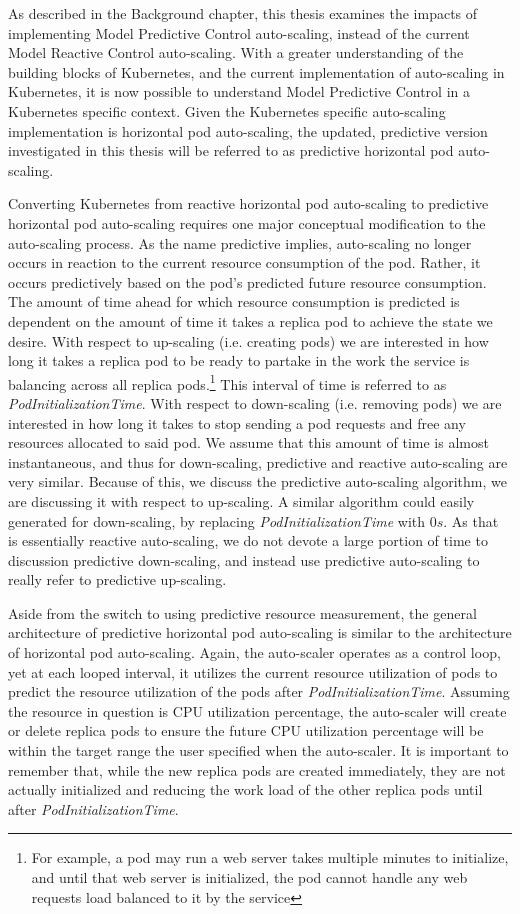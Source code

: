 As described in the Background chapter, this thesis examines the impacts of
implementing Model Predictive Control auto-scaling, instead of the current Model Reactive
Control auto-scaling. With a greater understanding of the building blocks of
Kubernetes, and the current implementation of auto-scaling in Kubernetes, it is
now possible to understand Model Predictive Control in a Kubernetes specific
context. Given the Kubernetes specific auto-scaling implementation is horizontal
pod auto-scaling, the updated, predictive version investigated in this thesis
will be referred to as predictive horizontal pod auto-scaling.

Converting Kubernetes from reactive horizontal pod auto-scaling to predictive
horizontal pod auto-scaling requires one major conceptual modification to the
auto-scaling process. As the name predictive implies, auto-scaling no longer
occurs in reaction to the current resource consumption of the pod. Rather, it occurs
predictively based on the pod's predicted future resource consumption. The
amount of time ahead for which resource consumption is predicted is dependent on
the amount of time it takes a replica pod to achieve the state we desire. With
respect to up-scaling (i.e. creating pods) we are interested in how long it
takes a replica pod to be ready to partake in the work the
service is balancing across all replica pods.\footnote{For example, a pod may
run a web server takes multiple minutes to initialize, and until that web server
is initialized, the pod cannot handle any web requests load balanced to it by
the service} This interval of time is referred to as \textit{PodInitializationTime}.
With respect to down-scaling (i.e. removing pods) we are interested in how long
it takes to stop sending a pod requests and free any resources allocated to said
pod. We assume that this amount of time is almost instantaneous, and thus for
down-scaling, predictive and reactive auto-scaling are very similar. Because of
this, we discuss the predictive auto-scaling algorithm, we are discussing it
with respect to up-scaling. A similar algorithm could easily generated for
down-scaling, by replacing \textit{PodInitializationTime} with $0s$. As that is
essentially reactive auto-scaling, we do not devote a large portion of time to
discussion predictive down-scaling, and instead use predictive auto-scaling to
really refer to predictive up-scaling.

Aside from the switch to using predictive resource measurement, the
general architecture of predictive horizontal pod auto-scaling is similar to the
architecture of horizontal pod auto-scaling. Again, the auto-scaler operates as a
control loop, yet at each looped interval, it utilizes the current resource
utilization of pods to predict the resource utilization of the pods after
\textit{PodInitializationTime}. Assuming the resource in question is CPU
utilization percentage, the auto-scaler will create or delete replica pods
to ensure the future CPU utilization percentage will be within the target range
the user specified when the auto-scaler. It is important to remember that, while
the new replica pods are created immediately, they are not actually initialized
and reducing the work load of the other replica pods until after
\textit{PodInitializationTime}.
